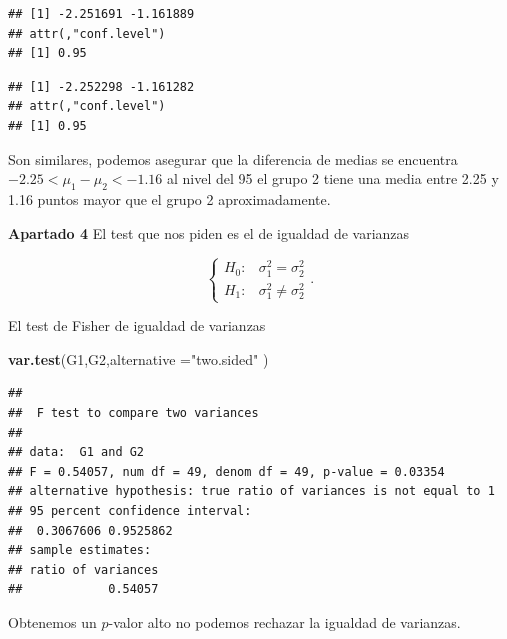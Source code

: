 \documentclass[
]{article}
\newenvironment{Shaded}{\begin{snugshade}}{\end{snugshade}}
\newcommand{\DataTypeTok}[1]{\textcolor[rgb]{0.13,0.29,0.53}{#1}}
\newcommand{\FloatTok}[1]{\textcolor[rgb]{0.00,0.00,0.81}{#1}}
\newcommand{\KeywordTok}[1]{\textcolor[rgb]{0.13,0.29,0.53}{\textbf{#1}}}
\newcommand{\NormalTok}[1]{#1}
\newcommand{\OperatorTok}[1]{\textcolor[rgb]{0.81,0.36,0.00}{\textbf{#1}}}
\newcommand{\OtherTok}[1]{\textcolor[rgb]{0.56,0.35,0.01}{#1}}
\newcommand{\StringTok}[1]{\textcolor[rgb]{0.31,0.60,0.02}{#1}}
\begin{document}
\begin{verbatim}
## [1] -2.251691 -1.161889
## attr(,"conf.level")
## [1] 0.95
\end{verbatim}

\begin{Shaded}
\end{Shaded}

\begin{verbatim}
## [1] -2.252298 -1.161282
## attr(,"conf.level")
## [1] 0.95
\end{verbatim}

Son similares, podemos asegurar que la diferencia de medias se encuentra
\(-2.25<\mu_1-\mu_2< -1.16\) al nivel del 95 el grupo 2 tiene una media
entre 2.25 y 1.16 puntos mayor que el grupo 2 aproximadamente.

\textbf{Apartado 4} El test que nos piden es el de igualdad de varianzas

\[\left\{\begin{array}{ll}H_0: & \sigma_1^2=\sigma_2^2\\
H_1: & \sigma_1^2\not=\sigma_2^2\end{array}\right..\]

El test de Fisher de igualdad de varianzas

\begin{Shaded}
\begin{Highlighting}[]
\KeywordTok{var.test}\NormalTok{(G1,G2,}\DataTypeTok{alternative =}\StringTok{"two.sided"}\NormalTok{ )}
\end{Highlighting}
\end{Shaded}

\begin{verbatim}
## 
##  F test to compare two variances
## 
## data:  G1 and G2
## F = 0.54057, num df = 49, denom df = 49, p-value = 0.03354
## alternative hypothesis: true ratio of variances is not equal to 1
## 95 percent confidence interval:
##  0.3067606 0.9525862
## sample estimates:
## ratio of variances 
##            0.54057
\end{verbatim}

Obtenemos un \(p\)-valor alto no podemos rechazar la igualdad de
varianzas.
\end{document}
